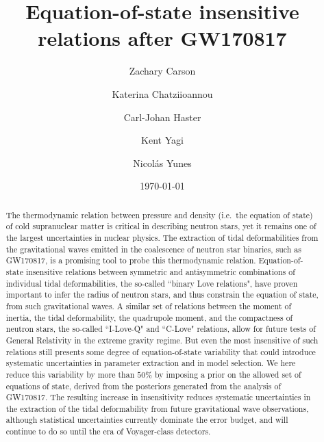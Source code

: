 \documentclass[prd,twocolumn,nofootinbib,superscriptaddress,amsmath,amssymb]{revtex4-1}
\begin{document}
\title{Equation-of-state insensitive relations after GW170817}

\author{Zachary Carson}
%

\author{Katerina Chatziioannou}
%

\author{Carl-Johan Haster}

\author{Kent Yagi}
%

\author{Nicol\'as Yunes}
%


\date{\today}


\begin{abstract}
The thermodynamic relation between pressure and density (i.e.~the equation of state) of cold supranuclear matter is critical in describing neutron stars, yet it remains one of the largest uncertainties in nuclear physics. 
The extraction of tidal deformabilities from the gravitational waves emitted in the coalescence of neutron star binaries, such as GW170817, is a promising tool to probe this thermodynamic relation.
Equation-of-state insensitive relations between symmetric and antisymmetric combinations of individual tidal deformabilities, the so-called  ``binary Love relations", have proven important to infer the radius of neutron stars, and thus constrain the equation of state, from such gravitational waves. 
A similar set of relations between the moment of inertia, the tidal deformability, the quadrupole moment, and the compactness of neutron stars, the so-called ``I-Love-Q" and ``C-Love" relations, allow for future tests of General Relativity in the extreme gravity regime. 
But even the most insensitive of such relations still presents some degree of equation-of-state variability that could introduce systematic uncertainties in parameter extraction and in model selection. 
%
We here reduce this variability by more than $50\%$ by imposing a prior on the allowed set of equations of state, derived from the posteriors generated from the analysis of GW170817.  
%
The resulting increase in insensitivity reduces systematic uncertainties in the extraction of the tidal deformability from future gravitational wave observations, although statistical uncertainties currently dominate the error budget, and will continue to do so until the era of Voyager-class detectors.  
\end{abstract}
\end{document}
